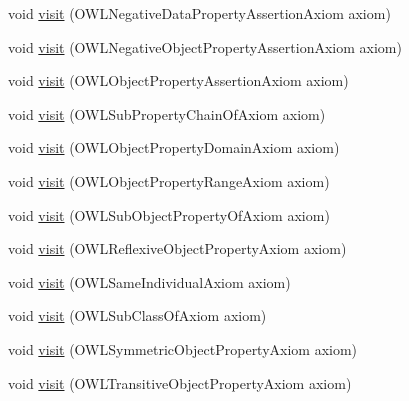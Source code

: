 \begin{DoxyCompactItemize}
\item 
void \hyperlink{classorg_1_1coode_1_1owlapi_1_1functionalrenderer_1_1_o_w_l_object_renderer_a06991f1f1814ab072dd54fd3412fac24}{visit} (O\-W\-L\-Negative\-Data\-Property\-Assertion\-Axiom axiom)
\item 
void \hyperlink{classorg_1_1coode_1_1owlapi_1_1functionalrenderer_1_1_o_w_l_object_renderer_ae2c00e6b06ed1776b821ac93b8c195db}{visit} (O\-W\-L\-Negative\-Object\-Property\-Assertion\-Axiom axiom)
\item 
void \hyperlink{classorg_1_1coode_1_1owlapi_1_1functionalrenderer_1_1_o_w_l_object_renderer_a59f7da73eb80a87a59a255347a8bc099}{visit} (O\-W\-L\-Object\-Property\-Assertion\-Axiom axiom)
\item 
void \hyperlink{classorg_1_1coode_1_1owlapi_1_1functionalrenderer_1_1_o_w_l_object_renderer_a03edbbec9c71f5fcba62e166dddb25d4}{visit} (O\-W\-L\-Sub\-Property\-Chain\-Of\-Axiom axiom)
\item 
void \hyperlink{classorg_1_1coode_1_1owlapi_1_1functionalrenderer_1_1_o_w_l_object_renderer_ac79f1dd6e88cb3d8f2b66db0ca130e49}{visit} (O\-W\-L\-Object\-Property\-Domain\-Axiom axiom)
\item 
void \hyperlink{classorg_1_1coode_1_1owlapi_1_1functionalrenderer_1_1_o_w_l_object_renderer_aaea6bd0f1e3779825a7f6724e8ae101d}{visit} (O\-W\-L\-Object\-Property\-Range\-Axiom axiom)
\item 
void \hyperlink{classorg_1_1coode_1_1owlapi_1_1functionalrenderer_1_1_o_w_l_object_renderer_af462af38359dbea30efc7a73e27748ef}{visit} (O\-W\-L\-Sub\-Object\-Property\-Of\-Axiom axiom)
\item 
void \hyperlink{classorg_1_1coode_1_1owlapi_1_1functionalrenderer_1_1_o_w_l_object_renderer_a5a508c061a44b405d64614b3f8b5d248}{visit} (O\-W\-L\-Reflexive\-Object\-Property\-Axiom axiom)
\item 
void \hyperlink{classorg_1_1coode_1_1owlapi_1_1functionalrenderer_1_1_o_w_l_object_renderer_af1576c89b0ccff4dbee3e819c5485434}{visit} (O\-W\-L\-Same\-Individual\-Axiom axiom)
\item 
void \hyperlink{classorg_1_1coode_1_1owlapi_1_1functionalrenderer_1_1_o_w_l_object_renderer_abbbd6710eb6c5c319f6d21e1fd9aef1a}{visit} (O\-W\-L\-Sub\-Class\-Of\-Axiom axiom)
\item 
void \hyperlink{classorg_1_1coode_1_1owlapi_1_1functionalrenderer_1_1_o_w_l_object_renderer_a6106f877a178f28198b0c810208310ab}{visit} (O\-W\-L\-Symmetric\-Object\-Property\-Axiom axiom)
\item 
void \hyperlink{classorg_1_1coode_1_1owlapi_1_1functionalrenderer_1_1_o_w_l_object_renderer_a0e95709ef6d9c27e0e3c72875b70ed16}{visit} (O\-W\-L\-Transitive\-Object\-Property\-Axiom axiom)

\end{DoxyCompactItemize}
